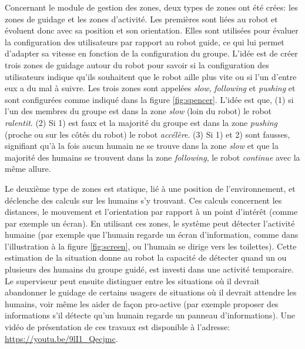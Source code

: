 \documentclass[a4paper,11pt,twoside]{StyleThese}
\begin{document}
Concernant le module de gestion des zones, deux types de zones ont été crées: les zones de guidage et les zones d'activité. Les premières sont liées au robot et évoluent donc avec sa position et son orientation. Elles sont utilisées pour évaluer la configuration des utilisateurs par rapport au robot guide, ce qui lui permet d'adapter sa vitesse en fonction de la configuration du groupe.
L'idée est de créer trois zones de guidage autour du robot pour savoir si la configuration des utilisateurs indique qu'ils souhaitent que le robot aille plus vite ou si l'un d'entre eux a du mal à suivre.
Les trois zones sont appelées \textit{slow}, \textit{following} et \textit{pushing} et sont configurées comme indiqué dans la figure \ref{fig:spencer}.
L'idée est que, (1) si l'un des membres du groupe est dans la zone \textit{slow} (loin du robot) le robot \textit{ralentit}. (2) Si 1) est faux et la majorité du groupe est dans la zone \textit{pushing} (proche ou sur les côtés du robot) le robot \textit{accélère}. (3) Si 1) et 2) sont fausses, signifiant qu'à la fois aucun humain ne se trouve dans la zone \textit{slow} et que la majorité des humains se trouvent dans la zone \textit{following}, le robot \textit{continue} avec la même allure.

Le deuxième type de zones est statique, lié à une position de l'environnement, et déclenche des calculs sur les humains s'y trouvant. Ces calculs concernent les distances, le mouvement et l'orientation par rapport à un point d'intérêt (comme par exemple un écran). En utilisant ces zones, le système peut détecter l'activité humaine (par exemple que l'humain regarde un écran d'information, comme dans l'illustration à la figure \ref{fig:screen}, ou l'humain se dirige vers les toilettes). Cette estimation de la situation donne au robot la capacité de détecter quand un ou plusieurs des humains du groupe guidé, est investi dans une activité temporaire. Le superviseur peut ensuite distinguer entre les situations où il devrait abandonner le guidage de certains usagers de situations où il devrait attendre les humains, voir même les aider de façon pro-active (par exemple proposer des informations s'il détecte qu'un humain regarde un panneau d'informations). Une vidéo de présentation de ces travaux est disponible à l'adresse: \url{https://youtu.be/9lI1_Qecjmc}.
\end{document}
